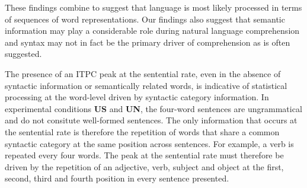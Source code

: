 \documentclass[10pt,letterpaper]{article}
\begin{document}
%
% 
%
These findings combine to suggest that language is most likely
processed in terms of sequences of word representations. Our findings
also suggest that semantic information may play a considerable role
during natural language comprehension and syntax may not in fact be
the primary driver of comprehension as is often suggested.

The presence of an ITPC peak at the sentential rate, even in the
absence of syntactic information or semantically related words, is
indicative of statistical processing at the word-level driven by
syntactic category information. 
%
%
%
%
%
%
%
In experimental conditions \textbf{US} and \textbf{UN}, the four-word sentences are
ungrammatical and do not consitute well-formed sentences. The only
information that occurs at the sentential rate is therefore the
repetition of words that share a common syntactic category at the same
position across sentences. For example, a verb is repeated every four
words. The peak at the sentential rate must therefore be driven by the
repetition of an adjective, verb, subject and object at the first,
second, third and fourth position in every sentence presented.
%
%
%
%
%
%
%
%
\end{document}

